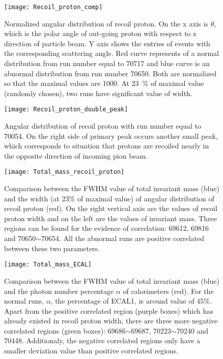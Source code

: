 \begin{figure}[!b]
	\centering
	\texttt{[image: Recoil\_proton\_comp]}
	\caption{Normalized angular distribution of recoil proton. On the x axis is $\theta$, which is the polar angle of out-going proton with respect to z direction of particle beam. Y axis shows the entries of events with the corresponding scattering angle. Red curve represents of a normal distribution from run number equal to 70717 and blue curve is an abnormal distribution from run number 70650. Both are normalized so that the maximal values are 1000. At \SI{23}{\percent} of maximal value (randomly chosen), two runs have significant value of width. }
	\label{fig:Recoil_proton_comp}
\end{figure}

\begin{figure}[!b]
	\centering
	\texttt{[image: Recoil\_proton\_double\_peak]}
	\caption{Angular distribution of recoil proton with run number equal to 70054. On the right side of primary peak occurs another small peak, which corresponds to situation that protons are recoiled nearly in the opposite direction of incoming pion beam. }
	\label{fig:Recoil_proton_double_peak}
\end{figure}

\begin{figure*}[!h]
	\centering
	\vspace{2cm}
	\texttt{[image: Total\_mass\_recoil\_proton]}
	\caption{Comparison between the FWHM value of total invariant mass (blue) and the width (at 23\% of maximal value) of angular distribution of recoil proton (red). On the right vertical axis are the values of recoil proton width and on the left are the values of invariant mass. Three regions can be found for the evidence of correlation: 69612, 69816 and 70650$\sim$70654. All the abnormal runs are positive correlated between these two parameters.}
	\label{fig:Total_mass_recoil_proton}
	\vspace{1 cm}
	
	\texttt{[image: Total\_mass\_ECAL]}
	\caption{Comparison between the FWHM value of total invariant mass (blue) and the photon number percentage $\alpha$ of calorimeters (red). For the normal runs, $\alpha$, the percentage of ECAL1, is around value of $45\%$. Apart from the positive correlated region (purple boxes) which has already existed in recoil proton width, there are three more negative correlated regions (green boxes): 69686$\sim$69687, 70223$\sim$70240 and 70448. Additionaly, the negative correlated regions only have a smaller deviation value than positive correlated regions.}
	\label{fig:Total_mass_ECAL}
	\vspace{3cm}
\end{figure*}

